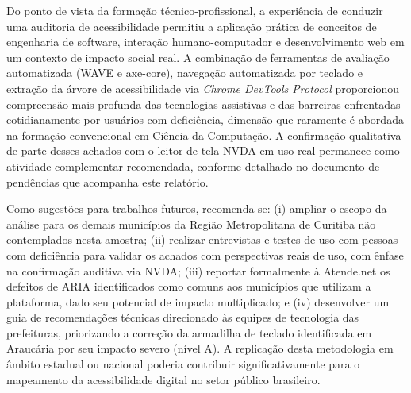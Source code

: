 \documentclass[brazil]{ifpr-pinhais}
\begin{document}
Do ponto de vista da formação técnico-profissional, a experiência de conduzir uma auditoria de acessibilidade permitiu a aplicação prática de conceitos de engenharia de software, interação humano-computador e desenvolvimento web em um contexto de impacto social real. A combinação de ferramentas de avaliação automatizada (WAVE e axe-core), navegação automatizada por teclado e extração da árvore de acessibilidade via \textit{Chrome DevTools Protocol} proporcionou compreensão mais profunda das tecnologias assistivas e das barreiras enfrentadas cotidianamente por usuários com deficiência, dimensão que raramente é abordada na formação convencional em Ciência da Computação. A confirmação qualitativa de parte desses achados com o leitor de tela NVDA em uso real permanece como atividade complementar recomendada, conforme detalhado no documento de pendências que acompanha este relatório.

Como sugestões para trabalhos futuros, recomenda-se: (i) ampliar o escopo da análise para os demais municípios da Região Metropolitana de Curitiba não contemplados nesta amostra; (ii) realizar entrevistas e testes de uso com pessoas com deficiência para validar os achados com perspectivas reais de uso, com ênfase na confirmação auditiva via NVDA; (iii) reportar formalmente à Atende.net os defeitos de ARIA identificados como comuns aos municípios que utilizam a plataforma, dado seu potencial de impacto multiplicado; e (iv) desenvolver um guia de recomendações técnicas direcionado às equipes de tecnologia das prefeituras, priorizando a correção da armadilha de teclado identificada em Araucária por seu impacto severo (nível A). A replicação desta metodologia em âmbito estadual ou nacional poderia contribuir significativamente para o mapeamento da acessibilidade digital no setor público brasileiro.

\postextual


\end{document}

